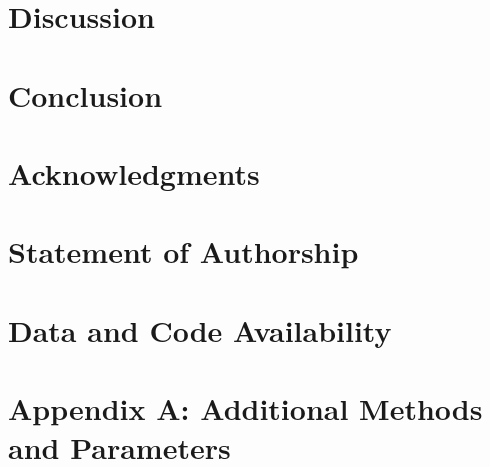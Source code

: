 \documentclass[11pt]{article}
\begin{document}
\section*{Discussion}

\section*{Conclusion}




\section*{Acknowledgments}



\section*{Statement of Authorship}



\section*{Data and Code Availability}
 

\section*{Appendix A: Additional Methods and Parameters}

%
%
%
%
\end{document}

